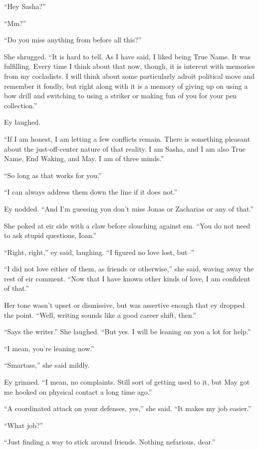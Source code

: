 ``Hey Sasha?''

``Mm?''

``Do you miss anything from before all this?''

She shrugged. ``It is hard to tell. As I have said, I liked being True Name. It was fulfilling. Every time I think about that now, though, it is intercut with memories from my cocladists. I will think about some particularly adroit political move and remember it fondly, but right along with it is a memory of giving up on using a bow drill and switching to using a striker or making fun of you for your pen collection.''

Ey laughed.

``If I am honest, I am letting a few conflicts remain. There is something pleasant about the just-off-center nature of that reality. I am Sasha, and I am also True Name, End Waking, and May. I am of three minds.''

``So long as that works for you.''

``I can always address them down the line if it does not.''

Ey nodded. ``And I'm guessing you don't miss Jonas or Zacharias or any of that.''

She poked at eir side with a claw before slouching against em. ``You do not need to ask stupid questions, Ioan.''

``Right, right,'' ey said, laughing. ``I figured no love lost, but--''

``I did not love either of them, as friends or otherwise,'' she said, waving away the rest of eir comment. ``Now that I have known other kinds of love, I am confident of that.''

Her tone wasn't upset or dismissive, but was assertive enough that ey dropped the point. ``Well, writing sounds like a good career shift, then.''

``Says the writer.'' She laughed. ``But yes. I will be leaning on you a lot for help.''

``I mean, you're leaning now.''

``Smartass,'' she said mildly.

Ey grinned. ``I mean, no complaints. Still sort of getting used to it, but May got me hooked on physical contact a long time ago.''

``A coordinated attack on your defenses, yes,'' she said. ``It makes my job easier.''

``What job?''

``Just finding a way to stick around friends. Nothing nefarious, dear.''

